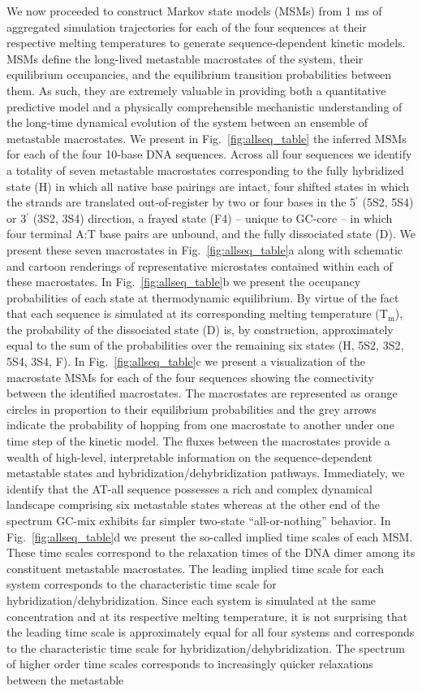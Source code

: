 \documentclass[journal=jpcbfk,manuscript=article]{achemso}
\begin{document}
We now proceeded to construct Markov state models (MSMs) from 1 ms of aggregated simulation trajectories for each of the four sequences at their respective melting temperatures to generate sequence-dependent kinetic models. MSMs define the long-lived metastable macrostates of the system, their equilibrium occupancies, and the equilibrium transition probabilities between them. As such, they are extremely valuable in providing both a quantitative predictive model and a physically comprehensible mechanistic understanding of the long-time dynamical evolution of the system between an ensemble of metastable macrostates. We present in Fig.~\ref{fig:allseq_table} the inferred MSMs for each of the four 10-base DNA sequences. Across all four sequences we identify a totality of seven metastable macrostates corresponding to the fully hybridized state (H) in which all native base pairings are intact, four shifted states in which the strands are translated out-of-register by two or four bases in the 5$^\prime$ (5S2, 5S4) or 3$^\prime$ (3S2, 3S4) direction, a frayed state (F4) -- unique to GC-core -- in which four terminal A:T base pairs are unbound, and the fully dissociated state (D). We present these seven macrostates in Fig.~\ref{fig:allseq_table}a along with schematic and cartoon renderings of representative microstates contained within each of these macrostates. In Fig.~\ref{fig:allseq_table}b we present the occupancy probabilities of each state at thermodynamic equilibrium. By virtue of the fact that each sequence is simulated at its corresponding melting temperature (T$_\mathrm{m}$), the probability of the dissociated state (D) is, by construction, approximately equal to the sum of the probabilities over the remaining six states (H, 5S2, 3S2, 5S4, 3S4, F). In Fig.~\ref{fig:allseq_table}c we present a visualization of the macrostate MSMs for each of the four sequences showing the connectivity between the identified macrostates. The macrostates are represented as orange circles in proportion to their equilibrium probabilities and the grey arrows indicate the probability of hopping from one macrostate to another under one time step of the kinetic model. The fluxes between the macrostates provide a wealth of high-level, interpretable information on the sequence-dependent metastable states and hybridization/dehybridization pathways. Immediately, we identify that the AT-all sequence possesses a rich and complex dynamical landscape comprising six metastable states whereas at the other end of the spectrum GC-mix exhibits far simpler two-state ``all-or-nothing'' behavior. In Fig.~\ref{fig:allseq_table}d we present the so-called implied time scales of each MSM. These time scales correspond to the relaxation times of the DNA dimer among its constituent metastable macrostates. The leading implied time scale for each system corresponds to the characteristic time scale for hybridization/dehybridization. Since each system is simulated at the same concentration and at its respective melting temperature, it is not surprising that the leading time scale is approximately equal for all four systems and corresponds to the characteristic time scale for hybridization/dehybridization. The spectrum of higher order time scales corresponds to increasingly quicker relaxations between the metastable 
\end{document}
